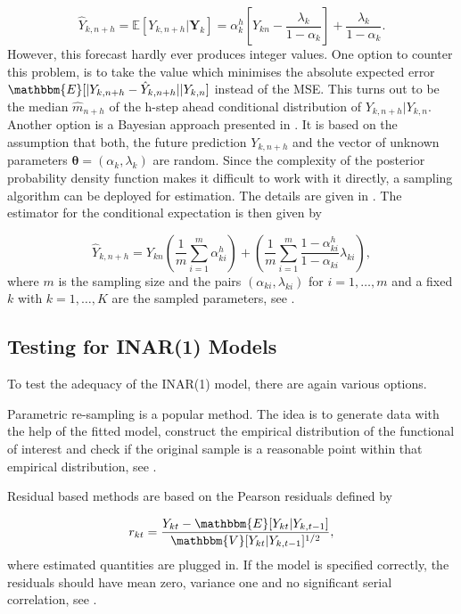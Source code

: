 \begin{equation}
\hat{Y}_{k,n+h} = \mathbb{E}[Y_{k,n+h} | \bm{Y}_k] = \alpha_k^h \left[Y_{kn}- \frac{\lambda_k}{1-\alpha_k} \right] + \frac{\lambda_k}{1-\alpha_k}.
\label{eq:Forecasting Classic}
\end{equation}
%
However, this forecast hardly ever produces integer values. One option to counter this problem, is to take the value which minimises the absolute expected error $\mathbbm{E}[\abs{Y_{k,n+h} - \hat{Y}_{k,n+h}}|Y_{k,n}]$ instead of the MSE. This turns out to be the median $\hat{m}_{n+h}$ of the h-step ahead conditional distribution of $Y_{k,n+h}|Y_{k,n}$. Another option is a Bayesian approach presented in \textcite{Silva:2005}. It is based on the assumption that both, the future prediction $Y_{k,n+h}$ and the vector of unknown parameters $\bm{\theta}=(\alpha_k,\lambda_k)$ are random. Since the complexity of the posterior probability density function makes it difficult to work with it directly, a sampling algorithm can be deployed for estimation. The details are given in \textcite{Silva:2005}. The estimator for the conditional expectation is then given by

\begin{equation}
\hat{Y}_{k,n+h}= Y_{kn}\left(\frac{1}{m} \sum_{i=1}^m\alpha_{ki}^h\right) + \left(\frac{1}{m} \sum_{i=1}^m \frac{1-\alpha_{ki}^h}{1-\alpha_{ki}}\lambda_{ki}\right),
\label{eq:Forecasting Bayesian}
\end{equation}
%
where $m$ is the sampling size and the pairs $(\alpha_{ki},\lambda_{ki})$ for $i=1,\ldots,m$ and a fixed $k$ with $k=1,\ldots,K$ are the sampled parameters, see \textcite{Silva:2005,Freeland:2004}. 

\subsection{Testing for INAR(1) Models}
\label{sec:Testing for INAR(1) Models}

To test the adequacy of the INAR(1) model, there are again various options. 

Parametric re-sampling is a popular method. The idea is to generate data with the help of the fitted model, construct the empirical distribution of the functional of interest and check if the original sample is a reasonable point within that empirical distribution, see \textcite{Silva:2005}. 

Residual based methods are based on the Pearson residuals defined by 

\begin{equation}
r_{kt} = \frac{Y_{kt}-\mathbbm{E}[Y_{kt}|Y_{k,t-1}]}{\mathbbm{V}[Y_{kt}|Y_{k,t-1}]^{1/2}},
\label{eq:Pearson residuals}
\end{equation}
%
where estimated quantities are plugged in. If the model is specified correctly, the residuals should have mean zero, variance one and no significant serial correlation, see \textcite{Silva:2005}. 

